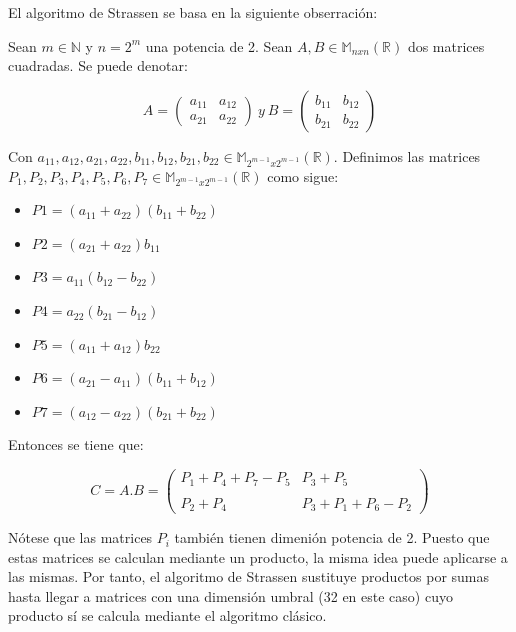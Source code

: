 \documentclass[]{article}
\begin{document}
El algoritmo de Strassen se basa en la siguiente obserración:

Sean $m \in \mathbb{N}$ y $n = 2^m$ una potencia de 2. Sean
$A,B \in \mathbb{M}_{nxn}(\mathbb{R})$ dos matrices cuadradas. Se puede
denotar:

\[ A = \left( \begin{array}{ccc}
a_{11} & a_{12} \\
a_{21} & a_{22} \end{array} \right) \ y
\ B = \left( \begin{array}{ccc}
b_{11} & b_{12} \\
b_{21} & b_{22} \end{array} \right)\]

Con
$a_{11}, a_{12}, a_{21}, a_{22}, b_{11}, b_{12}, b_{21}, b_{22} \in \mathbb{M}_{2^{m-1}x2^{m-1}}(\mathbb{R})$.
Definimos las matrices
$P_{1}, P_{2}, P_{3}, P_{4}, P_{5}, P_{6}, P_{7} \in \mathbb{M}_{2^{m-1}x2^{m-1}}(\mathbb{R})$
como sigue:

\begin{itemize}
\itemsep1pt\parskip0pt
\item
  $P1 = (a_{11} + a_{22})(b_{11} + b_{22})$\\
\item
  $P2 = (a_{21} + a_{22})b_{11}$\\
\item
  $P3 = a_{11}(b_{12} - b_{22})$\\
\item
  $P4 = a_{22}(b_{21} - b_{12})$\\
\item
  $P5 = (a_{11} + a_{12})b_{22}$\\
\item
  $P6 = (a_{21} - a_{11})(b_{11} + b_{12})$\\
\item
  $P7 = (a_{12} - a_{22})(b_{21} + b_{22})$
\end{itemize}

Entonces se tiene que:

\[ C = A.B = \left( \begin{array}{ccc}
P_1+P_4+P_7-P_5 & P_3 + P_5 \\
\\
P_2 + P_4 & P_3 + P_1 + P_6 - P_2 \end{array} \right)\]

Nótese que las matrices $P_i$ también tienen dimenión potencia de 2.
Puesto que estas matrices se calculan mediante un producto, la misma
idea puede aplicarse a las mismas. Por tanto, el algoritmo de Strassen
sustituye productos por sumas hasta llegar a matrices con una dimensión
umbral (32 en este caso) cuyo producto sí se calcula mediante el
algoritmo clásico.
\end{document}
